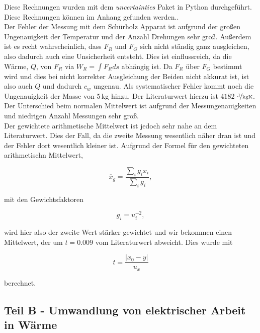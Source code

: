 \documentclass[11pt,a4paper]{article}
\begin{document}
Diese Rechnungen wurden mit dem \textit{uncertainties} Paket in Python durchgef\"uhrt. Diese Rechnungen k\"onnen im Anhang gefunden werden..\\

Der Fehler der Messung mit dem Sch\"urholz Apparat ist aufgrund der gro\ss en Ungenauigkeit der Temperatur und der Anzahl Drehungen sehr gro\ss. Au\ss erdem ist es recht wahrscheinlich, dass $F_{R}$ und $F_{G}$ sich nicht st\"andig ganz ausgleichen, also dadurch auch eine Unsicherheit entsteht. Dies ist einflussreich, da die W\"arme, $Q$, von $F_R$ via $W_R=\int F_Rds$ abh\"angig ist. Da $F_R$ \"uber $F_G$ bestimmt wird und dies bei nicht korrekter Ausgleichung der Beiden nicht akkurat ist, ist also auch $Q$ und dadurch $c_w$ ungenau. Als systematischer Fehler kommt noch die Ungenauigkeit der Masse von 5\,kg hinzu. Der Literaturwert hierzu ist $4182$ $\mathrm{\nicefrac{\mathrm{J}}{kg K}}$. Der Unterschied beim normalen Mittelwert ist aufgrund der Messungenauigkeiten und niedrigen Anzahl Messungen sehr gro\ss.\\

Der gewichtete arithmetische Mittelwert ist jedoch sehr nahe an dem Literaturwert. Dies der Fall, da die zweite Messung wesentlich n\"aher dran ist und der Fehler dort wesentlich kleiner ist. Aufgrund der Formel f\"ur den gewichteten arithmetischn Mittelwert,

\begin{equation}
\overline{x}_g=\frac{\sum_ig_ix_i}{\sum_ig_i},
\end{equation}

mit den Gewichtsfaktoren

\begin{equation}
g_i=u_i^{-2},
\end{equation}

wird hier also der zweite Wert st\"arker gewichtet und wir bekommen einen Mittelwert, der um $t = 0.009$ vom Literaturwert abweicht. Dies wurde mit 

\begin{equation}
t=\frac{|x_0-y|}{u_x}\label{abw}
\end{equation}

berechnet.

\pagebreak

\subsection{Teil B - Umwandlung von elektrischer Arbeit in Wärme}
\end{document}
